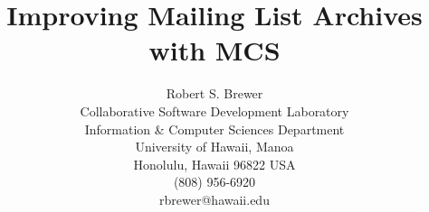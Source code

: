 



\title{Improving Mailing List Archives with MCS}
\author{
        \hspace*{-2ex}
        \parbox{4.0in} {\begin{center}
        {\authornamefont Robert S. Brewer}\\ 
        Collaborative Software Development Laboratory\\
        Information \& Computer Sciences Department\\
        University of Hawaii, Manoa\\
        Honolulu, Hawaii 96822  USA \\
        (808) 956-6920\\
        rbrewer@hawaii.edu
        \end{center} }}
\maketitle
\copyrightspace


\thispagestyle{empty}  %


\pagestyle{plain}



